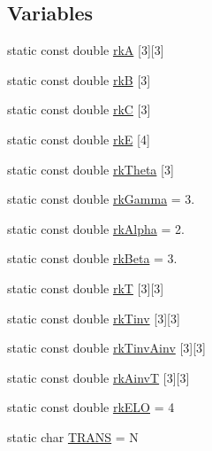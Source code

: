 \subsection*{Variables}
\begin{DoxyCompactItemize}
\item 
static const double \hyperlink{group__RK__Params_ga37314d1d93d3f053f469c40c5d42a43e}{rkA} \mbox{[}3\mbox{]}\mbox{[}3\mbox{]}
\item 
static const double \hyperlink{group__RK__Params_gaefb80779066572ac8b1e549cf1293de1}{rkB} \mbox{[}3\mbox{]}
\item 
static const double \hyperlink{group__RK__Params_ga7e8fecc1a981ceff1796a595b0ef5b4a}{rkC} \mbox{[}3\mbox{]}
\item 
static const double \hyperlink{group__RK__Params_gae792ec3177ed6d29903669bcde591f94}{rkE} \mbox{[}4\mbox{]}
\item 
static const double \hyperlink{group__RK__Params_ga905a164e07054850af60562b36b1aa9f}{rk\+Theta} \mbox{[}3\mbox{]}
\item 
static const double \hyperlink{group__RK__Params_ga188fa0b309eb2826403d911684735824}{rk\+Gamma} = 3.
\item 
static const double \hyperlink{group__RK__Params_gab60c47377f4985db23effa46e2239c24}{rk\+Alpha} = 2.
\item 
static const double \hyperlink{group__RK__Params_ga9a1ddba0cd8b29630b2c005af061c656}{rk\+Beta} = 3.
\item 
static const double \hyperlink{group__RK__Params_gac217dadb5a83f73958dba436ae4fa415}{rkT} \mbox{[}3\mbox{]}\mbox{[}3\mbox{]}
\item 
static const double \hyperlink{group__RK__Params_ga967c2bc749d9b8cda1585bf4ee50b1c1}{rk\+Tinv} \mbox{[}3\mbox{]}\mbox{[}3\mbox{]}
\item 
static const double \hyperlink{group__RK__Params_ga048232e984719eb1fed3f8ba7fb4c25b}{rk\+Tinv\+Ainv} \mbox{[}3\mbox{]}\mbox{[}3\mbox{]}
\item 
static const double \hyperlink{group__RK__Params_gaf7c73eb3be684541be92d125fef651bc}{rk\+AinvT} \mbox{[}3\mbox{]}\mbox{[}3\mbox{]}
\item 
static const double \hyperlink{group__RK__Params_ga8f0bf108626219e500ffe0b78c01b246}{rk\+E\+LO} = 4
\item 
static char \hyperlink{namespaceradau2a_ac3a739e01fca1200932ac123dc0bf0fa}{T\+R\+A\+NS} = \textquotesingle{}N\textquotesingle{}

\end{DoxyCompactItemize}
